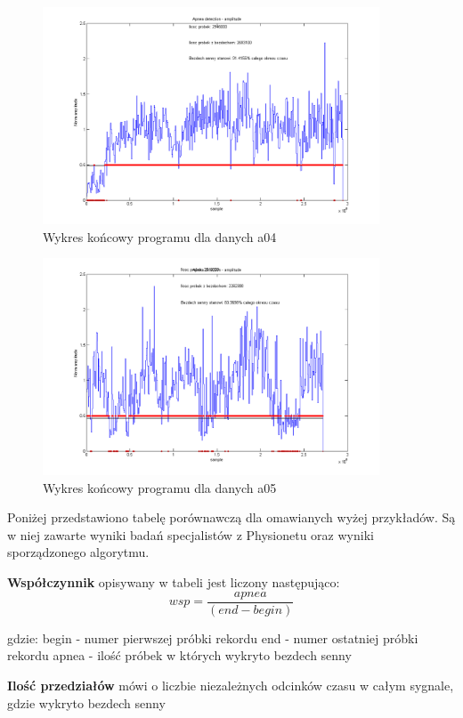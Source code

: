 \begin{figure}[H]
\centering
\includegraphics[width=10cm]{SLEEP_APNEA/img/apnea4.png}
\caption{Wykres końcowy programu dla danych a04}
\label{fig:apnea_4}
\end{figure}

\begin{figure}[H]
\centering
\includegraphics[width=10cm]{SLEEP_APNEA/img/apnea5.png}
\caption{Wykres końcowy programu dla danych a05}
\label{fig:apnea_5}
\end{figure} 


Poniżej przedstawiono tabelę porównawczą dla omawianych wyżej przykładów. Są w niej zawarte wyniki badań specjalistów z Physionetu oraz wyniki sporządzonego algorytmu. 


\textbf{Współczynnik} opisywany w tabeli jest liczony następująco:
 \begin{equation}
 wsp =\frac{apnea}{ (end-begin)} 
 \end{equation}

gdzie:
begin - numer pierwszej próbki rekordu
end - numer ostatniej próbki rekordu
apnea - ilość próbek w których wykryto bezdech senny


\textbf{Ilość przedziałów} mówi o liczbie niezależnych odcinków czasu w całym sygnale, gdzie wykryto bezdech senny

